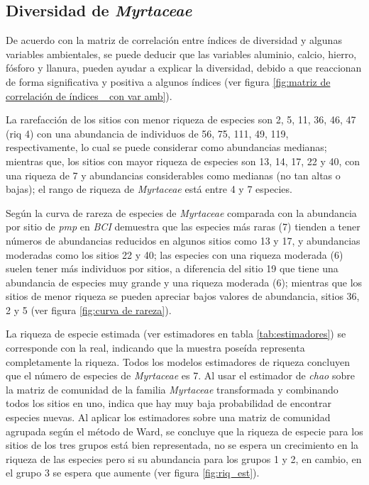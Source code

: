 \documentclass[11pt,]{article}
\begin{document}
\subsection{\texorpdfstring{Diversidad de
\emph{Myrtaceae}}{Diversidad de Myrtaceae}}\label{diversidad-de-myrtaceae}

De acuerdo con la matriz de correlación entre índices de diversidad y
algunas variables ambientales, se puede deducir que las variables
aluminio, calcio, hierro, fósforo y llanura, pueden ayudar a explicar la
diversidad, debido a que reaccionan de forma significativa y positiva a
algunos índices (ver figura
\ref{fig:matriz de correlación de índices _con var amb}).

La rarefacción de los sitios con menor riqueza de especies son 2, 5, 11,
36, 46, 47 (riq 4) con una abundancia de individuos de 56, 75, 111, 49,
119, respectivamente, lo cual se puede considerar como abundancias
medianas; mientras que, los sitios con mayor riqueza de especies son 13,
14, 17, 22 y 40, con una riqueza de 7 y abundancias considerables como
medianas (no tan altas o bajas); el rango de riqueza de \emph{Myrtaceae}
está entre 4 y 7 especies.

Según la curva de rareza de especies de \emph{Myrtaceae} comparada con
la abundancia por sitio de \emph{pmp} en \emph{BCI} demuestra que las
especies más raras (7) tienden a tener números de abundancias reducidos
en algunos sitios como 13 y 17, y abundancias moderadas como los sitios
22 y 40; las especies con una riqueza moderada (6) suelen tener más
individuos por sitios, a diferencia del sitio 19 que tiene una
abundancia de especies muy grande y una riqueza moderada (6); mientras
que los sitios de menor riqueza se pueden apreciar bajos valores de
abundancia, sitios 36, 2 y 5 (ver figura \ref{fig:curva de rareza}).

La riqueza de especie estimada (ver estimadores en tabla
\ref{tab:estimadores}) se corresponde con la real, indicando que la
muestra poseída representa completamente la riqueza. Todos los modelos
estimadores de riqueza concluyen que el número de especies de
\emph{Myrtaceae} es 7. Al usar el estimador de \emph{chao} sobre la
matriz de comunidad de la familia \emph{Myrtaceae} transformada y
combinando todos los sitios en uno, indica que hay muy baja probabilidad
de encontrar especies nuevas. Al aplicar los estimadores sobre una
matriz de comunidad agrupada según el método de Ward, se concluye que la
riqueza de especie para los sitios de los tres grupos está bien
representada, no se espera un crecimiento en la riqueza de las especies
pero si su abundancia para los grupos 1 y 2, en cambio, en el grupo 3 se
espera que aumente (ver figura \ref{fig:riq_est}).
\end{document}
